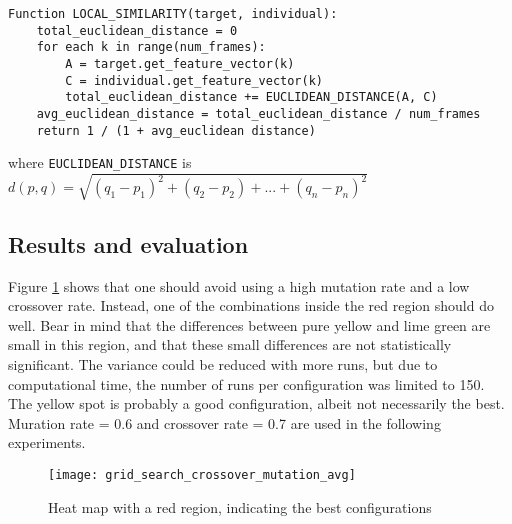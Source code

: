 \begin{verbatim}
Function LOCAL_SIMILARITY(target, individual):
    total_euclidean_distance = 0
    for each k in range(num_frames):
        A = target.get_feature_vector(k)
        C = individual.get_feature_vector(k)
        total_euclidean_distance += EUCLIDEAN_DISTANCE(A, C)
    avg_euclidean_distance = total_euclidean_distance / num_frames
    return 1 / (1 + avg_euclidean distance)
\end{verbatim}

where \texttt{EUCLIDEAN\_DISTANCE} is $d(p,q)=\sqrt{(q_1-p_1)^2+(q_2-p_2)+...+(q_n-p_n)^2}$

\subsection{Results and evaluation}
Figure \ref{fig:exp1_heatmap} shows that one should avoid using a high mutation rate and a low crossover rate. Instead, one of the combinations inside the red region should do well. Bear in mind that the differences between pure yellow and lime green are small in this region, and that these small differences are not statistically significant. The variance could be reduced with more runs, but due to computational time, the number of runs per configuration was limited to 150. The yellow spot is probably a good configuration, albeit not necessarily the best. Muration rate = 0.6 and crossover rate = 0.7 are used in the following experiments.

\begin{figure}[h]
    \centering
    \texttt{[image: grid\_search\_crossover\_mutation\_avg]}
    \caption{Heat map with a red region, indicating the best configurations}
    \label{fig:exp1_heatmap}
\end{figure}
